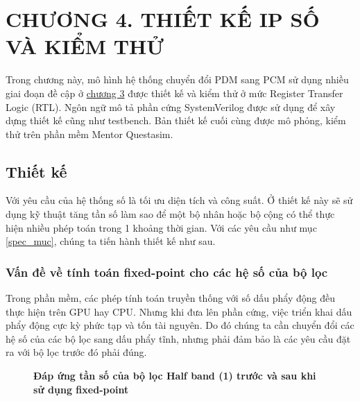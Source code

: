 \section*{CHƯƠNG 4. THIẾT KẾ IP SỐ VÀ KIỂM THỬ}
\setcounter{section}{4}
\setcounter{figure}{0}
\setcounter{table}{0}
Trong chương này, mô hình hệ thống chuyển đổi PDM sang PCM sử dụng nhiều giai đoạn đề cập ở \hyperref[chuong3]{chương 3} được thiết kế và kiểm thử ở mức Register Transfer Logic (RTL). Ngôn ngữ mô tả phần cứng SystemVerilog được sử dụng để xây dựng thiết kế cũng như testbench. Bản thiết kế cuối cùng được mô phỏng, kiểm thử trên phần mềm Mentor Questasim.
\subsection{Thiết kế}
Với yêu cầu của hệ thống số là tối ưu diện tích và công suất. Ở thiết kế này sẽ sử dụng kỹ thuật tăng tần số làm sao để một bộ nhân hoặc bộ cộng có thể thực hiện nhiều phép toán trong 1 khoảng thời gian. Với các yêu cầu như mục \ref{spec_muc}, chúng ta tiến hành thiết kế như sau.
\subsubsection{Vấn đề về tính toán fixed-point cho các hệ số của bộ lọc}
Trong phần mềm, các phép tính toán truyền thống với số dấu phẩy động đều thực hiện
trên GPU hay CPU. Nhưng khi đưa lên phần cứng, việc triển khai dấu phẩy động cực kỳ phức tạp và tốn tài nguyên. Do đó chúng ta cần chuyển đổi các hệ số của các bộ lọc sang dấu phẩy tĩnh, nhưng phải đảm bảo là các yêu cầu đặt ra với bộ lọc trước đó phải đúng.

\begin{figure}[H]
    \centering
    
    \caption[Đáp ứng tần số của bộ lọc Half band (1) trước và sau khi sử dụng fixed-point]{\bfseries \fontsize{12pt}{0pt}\selectfont Đáp ứng tần số của bộ lọc Half band (1) trước và sau khi sử dụng fixed-point}
    \label{hb1_d}
\end{figure}


